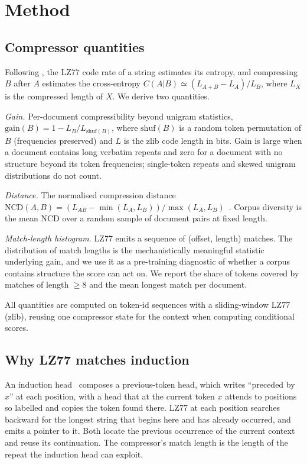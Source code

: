 \documentclass[11pt]{article}
\newcommand{\gain}{\mathrm{gain}}
\newcommand{\ncd}{\mathrm{NCD}}
\begin{document}
\section{Method}\label{sec:method}

\subsection{Compressor quantities}
Following \citet{baronchelli2005zippers}, the LZ77 code rate of a string
estimates its entropy, and compressing $B$ after $A$ estimates the
cross-entropy $C(A|B)\simeq(L_{A+B}-L_A)/L_B$, where $L_X$ is the
compressed length of $X$. We derive two quantities.

\emph{Gain.} Per-document compressibility beyond unigram statistics,
$\gain(B)=1-L_B/L_{\mathrm{shuf}(B)}$, where $\mathrm{shuf}(B)$ is a random
token permutation of $B$ (frequencies preserved) and $L$ is the zlib code
length in bits. Gain is large when a document contains long verbatim
repeats and zero for a document with no structure beyond its token
frequencies; single-token repeats and skewed unigram distributions do not
count.

\emph{Distance.} The normalised compression distance
$\ncd(A,B)=(L_{AB}-\min(L_A,L_B))/\max(L_A,L_B)$~\citep{li2004ncd}.
Corpus diversity is the mean $\ncd$ over a random sample of document pairs
at fixed length.

\emph{Match-length histogram.} LZ77 emits a sequence of (offset, length)
matches. The distribution of match lengths is the mechanistically
meaningful statistic underlying gain, and we use it as a pre-training
diagnostic of whether a corpus contains structure the score can act on. We
report the share of tokens covered by matches of length $\geq8$ and the
mean longest match per document.

All quantities are computed on token-id sequences with a sliding-window
LZ77 (zlib), reusing one compressor state for the context when computing
conditional scores.

\subsection{Why LZ77 matches induction}
An induction head~\citep{olsson2022induction} composes a previous-token
head, which writes ``preceded by $x$'' at each position, with a head that at
the current token $x$ attends to positions so labelled and copies the token
found there. LZ77 at each position searches backward for the longest string
that begins here and has already occurred, and emits a pointer to it. Both
locate the previous occurrence of the current context and reuse its
continuation. The compressor's match length is the length of the repeat
the induction head can exploit.
\end{document}

